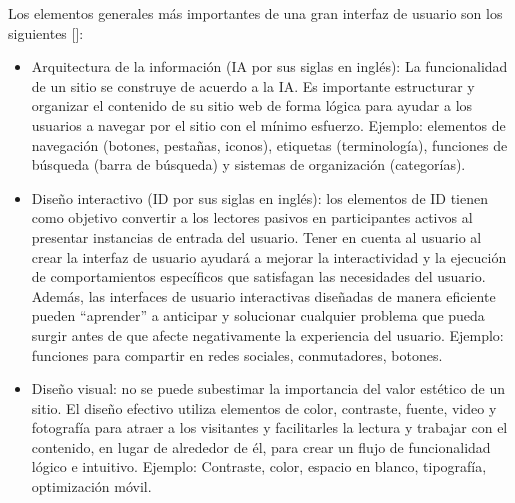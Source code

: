


Los elementos generales más importantes de una gran interfaz de usuario son los siguientes [\cite{26}]:
\begin{itemize}
\item Arquitectura de la información (IA por sus siglas en inglés): La funcionalidad de un sitio se construye de acuerdo a la IA. Es importante estructurar y organizar el contenido de su sitio web de forma lógica para ayudar a los usuarios a navegar por el sitio con el mínimo esfuerzo. 
Ejemplo: elementos de navegación (botones, pestañas, iconos), etiquetas (terminología), funciones de búsqueda (barra de búsqueda) y sistemas de organización (categorías).
\item Diseño interactivo (ID por sus siglas en inglés): los elementos de ID tienen como objetivo convertir a los lectores pasivos en participantes activos al presentar instancias de entrada del usuario. Tener en cuenta al usuario al crear la interfaz de usuario ayudará a mejorar la interactividad y la ejecución de comportamientos específicos que satisfagan las necesidades del usuario. Además, las interfaces de usuario interactivas diseñadas de manera eficiente pueden ``aprender'' a anticipar y solucionar cualquier problema que pueda surgir antes de que afecte negativamente la experiencia del usuario.
Ejemplo: funciones para compartir en redes sociales, conmutadores, botones.
\item Diseño visual: no se puede subestimar la importancia del valor estético de un sitio. El diseño efectivo utiliza elementos de color, contraste, fuente, video y fotografía para atraer a los visitantes y facilitarles la lectura y trabajar con el contenido, en lugar de alrededor de él, para crear un flujo de funcionalidad lógico e intuitivo.
Ejemplo: Contraste, color, espacio en blanco, tipografía, optimización móvil.
\end{itemize}

